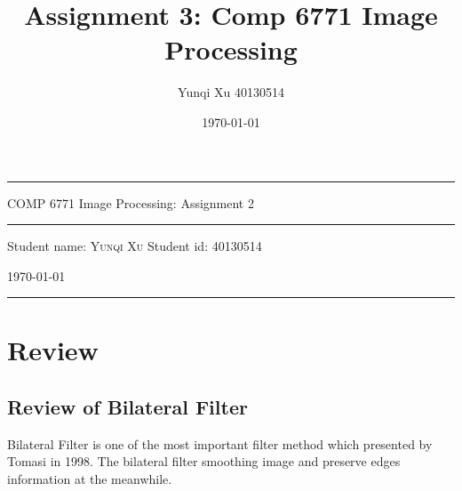 \documentclass[12pt]{article}
\title{Assignment 3: Comp 6771 Image Processing}
\author{Yunqi Xu 40130514}
\date{\today}
\begin{document}

\begin{titlepage}
  \rule{\textwidth}{1pt}   %
    \vspace{0.2\textheight}  %


    {\Huge COMP 6771 Image Processing: Assignment 2}

    \vspace{0.025\textheight}   %

    \rule{0.83\textwidth}{0.4pt}  %

    \vspace{0.1\textheight}  %


    {\Large Student name: \textsc{Yunqi Xu}}
    \vfill
    {\Large Student id: 40130514}
    \vfill  %

    {\large \today}
    \vspace{0.1\textheight}  %


    \rule{\textwidth}{1pt}  %
\end{titlepage}

\section{Review}
\subsection{Review of Bilateral Filter}
Bilateral Filter is one of the most important filter method which presented by Tomasi in 1998. 
The bilateral filter smoothing image and preserve edges information at the meanwhile.
\end{document}
